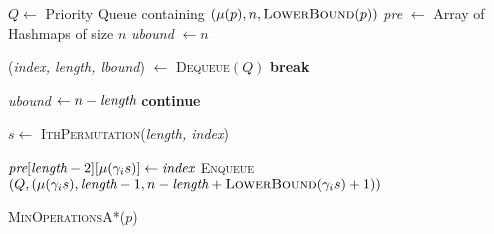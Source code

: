 \documentclass[a4paper, 10pt, ngerman]{article}
\begin{document}
\begin{algorithm}

    $Q \gets$ Priority Queue containing $(\mu(p), n, \textsc{LowerBound}(p))$ \;
    \emph{pre} $\gets$ Array of Hashmaps of size $n$ \;
    \emph{ubound} $\gets n$ \;

    {
        (\emph{index, length, lbound}) $\gets$ \textsc{Dequeue}$(Q)$ \;
        {
            \textbf{break} \;
        }

        {
            {
                \emph{ubound} $\gets n - \emph{length}$ \;
            }
            \textbf{continue} \;
        }

        $s \gets$ \textsc{IthPermutation}(\emph{length, index}) \;

        {
            {
                $\emph{pre}[\emph{length} - 2][\mu(\gamma_i s)] \gets \emph{index}$ \;
                \textsc{Enqueue}$(Q, (\mu(\gamma_i s), \emph{length} - 1, n - \emph{length} + \textsc{LowerBound}(\gamma_i s) + 1))$ \;
            }
        }
    }

     \;

    \caption{\textsc{MinOperationsA*}($p$)}
\end{algorithm}
\end{document}
